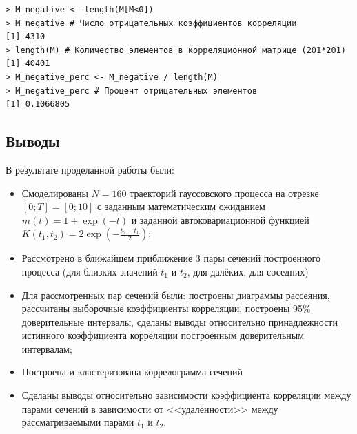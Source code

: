 \documentclass[14pt,a4paper]{scrartcl}
\begin{document}
\begin{verbatim}
> M_negative <- length(M[M<0])
> M_negative # Число отрицательных коэффициентов корреляции
[1] 4310
> length(M) # Количество элементов в корреляционной матрице (201*201)
[1] 40401
> M_negative_perc <- M_negative / length(M)
> M_negative_perc # Процент отрицательных элементов
[1] 0.1066805
\end{verbatim}

\pagebreak
\subsection*{Выводы}
В результате проделанной работы были:
\begin{itemize}
	\item Смоделированы $N=160$ траекторий гауссовского процесса на отрезке $[0;T] = [0;10]$ с заданным математическим ожиданием ${m(t) = 1 + \exp(-t)}$ и заданной автоковариационной функцией $K(t_1,t_2) = 2\exp(-\frac{t_2-t_1}{2})$;
	\item Рассмотрено в ближайшем приближение 3 пары сечений построенного процесса (для близких значений $t_1$ и $t_2$, для далёких, для соседних)
	\item Для рассмотренных пар сечений были:
		\subitem построены диаграммы рассеяния,
		\subitem рассчитаны выборочные коэффициенты корреляции,
		\subitem построены 95\% доверительные интервалы,
		\subitem сделаны выводы относительно принадлежности истинного коэффициента корреляции построенным доверительным интервалам;
	\item Построена и кластеризована коррелограмма сечений
	\item Сделаны выводы относительно зависимости коэффициента корреляции между парами сечений в зависимости от <<удалённости>> между рассматриваемыми парами $t_1$ и $t_2$.
\end{itemize}
\end{document}

